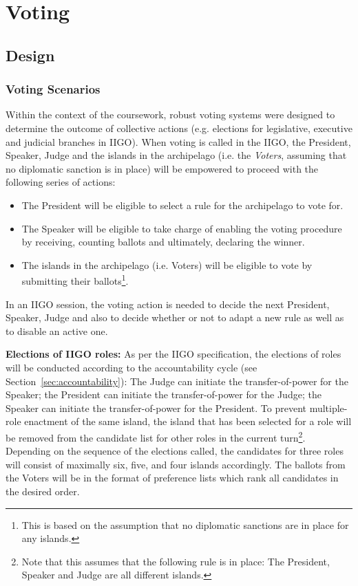 \chapter{Voting}
\section{Design}
\label{sec:VotingDeisng}
\subsection{Voting Scenarios}
\label{subsec:VotingScenarios}

Within the context of the coursework, robust voting systems were designed to determine the outcome of collective actions (e.g. elections for legislative, executive and judicial branches in IIGO).
When voting is called in the IIGO, the President, Speaker, Judge and the islands in the archipelago (i.e. the \emph{Voters}, assuming that no diplomatic sanction is in place) will be empowered to proceed with the following series of actions:
\begin{itemize}
    \item The President will be eligible to select a rule for the archipelago to vote for.
    \item The Speaker will be eligible to take charge of enabling the voting procedure by receiving, counting ballots and ultimately, declaring the winner.
    \item The islands in the archipelago (i.e. Voters) will be eligible to vote by submitting their ballots\footnote{This is based on the assumption that no diplomatic sanctions are in place for any islands.}.
\end{itemize}

In an IIGO session, the voting action is needed to decide the next President, Speaker, Judge and also to decide whether or not to adapt a new rule as well as to disable an active one.

\textbf{Elections of IIGO roles:} As per the IIGO specification, the elections of roles will be conducted according to the accountability cycle (see Section~\ref{sec:accountability}): The Judge can initiate the transfer-of-power for the Speaker; the President can initiate the transfer-of-power for the Judge; the Speaker can initiate the transfer-of-power for the President. To prevent multiple-role enactment of the same island, the island that has been selected for a role will be removed from the candidate list for other roles in the current turn\footnote{Note that this assumes that the following rule is in place: The President, Speaker and Judge are all different islands.}. Depending on the sequence of the elections called, the candidates for three roles will consist of maximally six, five, and four islands accordingly. The ballots from the Voters will be in the format of preference lists which rank all candidates in the desired order.

